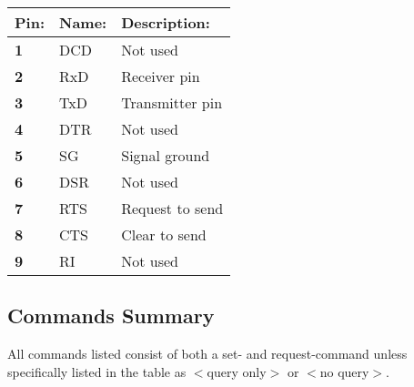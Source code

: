 \begin{tabular}{|l|l|l|}
\hline
\textbf{Pin:} & \textbf{Name:} & \textbf{Description:} \\ \hline
\textbf{1}		& DCD & Not used\\ \hline
\textbf{2}		& RxD & Receiver pin\\ \hline
\textbf{3}		& TxD & Transmitter pin\\ \hline
\textbf{4}		& DTR & Not used\\ \hline
\textbf{5}		& SG & Signal ground\\ \hline
\textbf{6}		& DSR & Not used\\ \hline
\textbf{7}		& RTS & Request to send\\ \hline
\textbf{8}		& CTS & Clear to send\\ \hline
\textbf{9}		& RI & Not used\\ \hline
\end{tabular}

\subsection{Commands Summary}

All commands listed consist of both a set- and request-command unless specifically listed in the table as $<$query only$>$ or $<$no query$>$.

